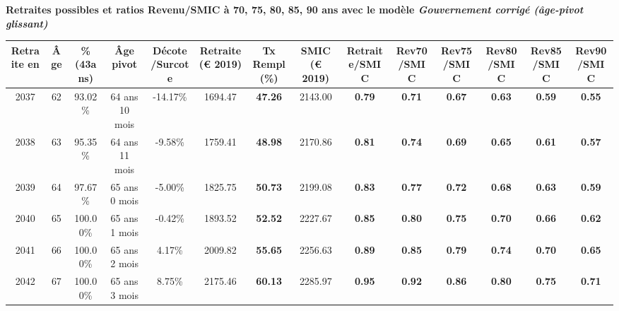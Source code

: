  \vspace{0.1cm} 
{\bf \noindent Retraites possibles et ratios Revenu/SMIC à 70, 75, 80, 85, 90 ans avec le modèle \emph{Gouvernement corrigé (âge-pivot glissant)}}  
 
\begin{adjustbox}{max width=\textwidth} 
\begin{tabular}[htb]{|c|c||c|c|c||c|c||c||c|c|c|c|c|c|} 
\hline 
 Retraite en &  Âge &  \%(43ans) &  Âge pivot &  Décote/Surcote &  Retraite (\euro{} 2019) &  Tx Rempl(\%) &  SMIC (\euro{} 2019) &  Retraite/SMIC &  Rev70/SMIC &  Rev75/SMIC &  Rev80/SMIC &  Rev85/SMIC &  Rev90/SMIC \\ 
\hline \hline 
 2037 &  62 &  93.02\% &  64 ans 10 mois &  -14.17\% &  1694.47 &  {\bf 47.26} &  2143.00 &  {\bf {\color{red} 0.79}} &  {\bf {\color{red} 0.71}} &  {\bf {\color{red} 0.67}} &  {\bf {\color{red} 0.63}} &  {\bf {\color{red} 0.59}} &  {\bf {\color{red} 0.55}} \\ 
\hline 
 2038 &  63 &  95.35\% &  64 ans 11 mois &  -9.58\% &  1759.41 &  {\bf 48.98} &  2170.86 &  {\bf {\color{red} 0.81}} &  {\bf {\color{red} 0.74}} &  {\bf {\color{red} 0.69}} &  {\bf {\color{red} 0.65}} &  {\bf {\color{red} 0.61}} &  {\bf {\color{red} 0.57}} \\ 
\hline 
 2039 &  64 &  97.67\% &  65 ans 0 mois &  -5.00\% &  1825.75 &  {\bf 50.73} &  2199.08 &  {\bf {\color{red} 0.83}} &  {\bf {\color{red} 0.77}} &  {\bf {\color{red} 0.72}} &  {\bf {\color{red} 0.68}} &  {\bf {\color{red} 0.63}} &  {\bf {\color{red} 0.59}} \\ 
\hline 
 2040 &  65 &  100.00\% &  65 ans 1 mois &  -0.42\% &  1893.52 &  {\bf 52.52} &  2227.67 &  {\bf {\color{red} 0.85}} &  {\bf {\color{red} 0.80}} &  {\bf {\color{red} 0.75}} &  {\bf {\color{red} 0.70}} &  {\bf {\color{red} 0.66}} &  {\bf {\color{red} 0.62}} \\ 
\hline 
 2041 &  66 &  100.00\% &  65 ans 2 mois &  4.17\% &  2009.82 &  {\bf 55.65} &  2256.63 &  {\bf {\color{red} 0.89}} &  {\bf {\color{red} 0.85}} &  {\bf {\color{red} 0.79}} &  {\bf {\color{red} 0.74}} &  {\bf {\color{red} 0.70}} &  {\bf {\color{red} 0.65}} \\ 
\hline 
 2042 &  67 &  100.00\% &  65 ans 3 mois &  8.75\% &  2175.46 &  {\bf 60.13} &  2285.97 &  {\bf {\color{red} 0.95}} &  {\bf {\color{red} 0.92}} &  {\bf {\color{red} 0.86}} &  {\bf {\color{red} 0.80}} &  {\bf {\color{red} 0.75}} &  {\bf {\color{red} 0.71}} \\ 
\hline 
\hline 
\end{tabular} 
\end{adjustbox} 
 
